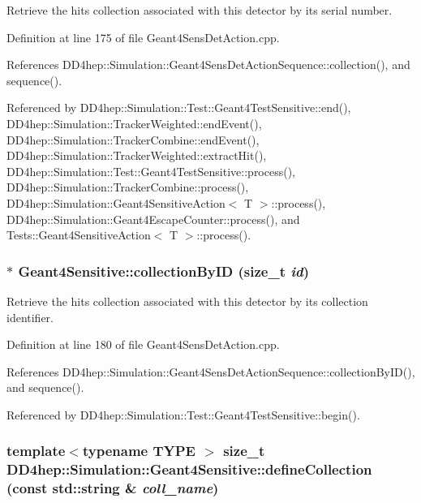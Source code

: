 Retrieve the hits collection associated with this detector by its serial number. 

Definition at line 175 of file Geant4SensDetAction.cpp.

References DD4hep::Simulation::Geant4SensDetActionSequence::collection(), and sequence().

Referenced by DD4hep::Simulation::Test::Geant4TestSensitive::end(), DD4hep::Simulation::TrackerWeighted::endEvent(), DD4hep::Simulation::TrackerCombine::endEvent(), DD4hep::Simulation::TrackerWeighted::extractHit(), DD4hep::Simulation::Test::Geant4TestSensitive::process(), DD4hep::Simulation::TrackerCombine::process(), DD4hep::Simulation::Geant4SensitiveAction$<$ T $>$::process(), DD4hep::Simulation::Geant4EscapeCounter::process(), and Tests::Geant4SensitiveAction$<$ T $>$::process().\hypertarget{class_d_d4hep_1_1_simulation_1_1_geant4_sensitive_ad45d2c806dd89d1434ba8eec35b87843}{
\subsubsection[{collectionByID}]{ $\ast$ Geant4Sensitive::collectionByID (size\_\-t {\em id})}}
\label{class_d_d4hep_1_1_simulation_1_1_geant4_sensitive_ad45d2c806dd89d1434ba8eec35b87843}


Retrieve the hits collection associated with this detector by its collection identifier. 

Definition at line 180 of file Geant4SensDetAction.cpp.

References DD4hep::Simulation::Geant4SensDetActionSequence::collectionByID(), and sequence().

Referenced by DD4hep::Simulation::Test::Geant4TestSensitive::begin().\hypertarget{class_d_d4hep_1_1_simulation_1_1_geant4_sensitive_aecf98b3e67c2abd037499421bca5348f}{
\subsubsection[{defineCollection}]{\setlength{\rightskip}{0pt plus 5cm}template$<$typename TYPE $>$ size\_\-t DD4hep::Simulation::Geant4Sensitive::defineCollection (const std::string \& {\em coll\_\-name})}}
\label{class_d_d4hep_1_1_simulation_1_1_geant4_sensitive_aecf98b3e67c2abd037499421bca5348f}


